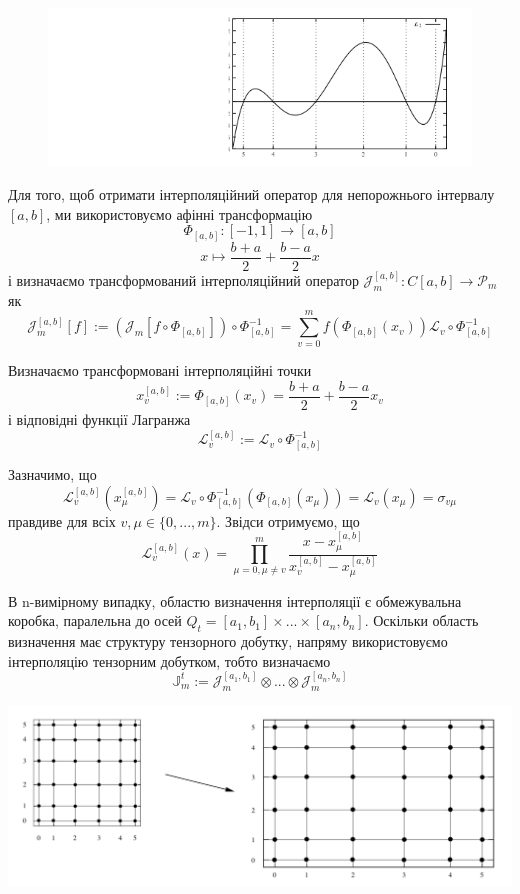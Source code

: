 \documentclass[12pt]{report}
\begin{document}
		\begin{figure}[h]{
				\includegraphics{2_1}
			}
		\end{figure}
	\par Для того, щоб отримати інтерполяційний оператор для непорожнього інтервалу $[a,b]$, ми використовуємо афінні трансформацію
	$$\Phi_{[a,b]}:[-1,1]\rightarrow [a,b]$$
	$$x\mapsto \frac{b+a}{2}+\frac{b-a}{2}x$$
	і визначаємо трансформований інтерполяційний оператор $\mathcal{J}_m^{[a,b]}:C[a,b]\rightarrow\mathcal{P}_m$ як
	$$\mathcal{J}_m^{[a,b]}[f] := (\mathcal{J}_m[f\circ\Phi_{[a,b]}])\circ \Phi_{[a,b]}^{-1}=\sum_{v=0}^{m}f(\Phi_{[a,b]}(x_v))\mathcal{L}_v\circ\Phi_{[a,b]}^{-1}$$
	\par Визначаємо трансформовані інтерполяційні точки
	$$x_v^{[a,b]}:=\Phi_{[a,b]}(x_v)=\frac{b+a}{2}+\frac{b-a}{2}x_v$$
	і відповідні функції Лагранжа
	$$\mathcal{L}_v^{[a,b]}:=\mathcal{L}_v\circ\Phi_{[a,b]}^{-1}$$
	\par Зазначимо, що
	$$\mathcal{L}_v^{[a,b]}(x_\mu^{[a,b]})=\mathcal{L}_v\circ\Phi_{[a,b]}^{-1}(\Phi_{[a,b]}(x_\mu))=\mathcal{L}_v(x_\mu)=\sigma_{v\mu}$$
	правдиве для всіх $v,\mu\in\{0,...,m\}$. Звідси отримуємо, що
	$$\mathcal{L}_v^{[a,b]}(x)=\prod_{\mu=0,\mu\not=v}^{m}\frac{x-x_\mu^{[a,b]}}{x_v^{[a,b]}-x_\mu^{[a,b]}}$$
	\par В n-вимірному випадку, областю визначення інтерполяції є обмежувальна коробка, паралельна до осей $Q_t=[a_1,b_1]\times...\times[a_n,b_n]$. Оскільки область визначення має структуру тензорного добутку, напряму використовуємо інтерполяцію тензорним добутком, тобто визначаємо 
	$$\mathbb{J}_m^t:=\mathcal{J}_m^{[a_1,b_1]}\otimes...\otimes\mathcal{J}_m^{[a_n,b_n]}$$ 
	\begin{center}
		\includegraphics[scale=0.5]{2_6}
	\end{center}
\end{document}
